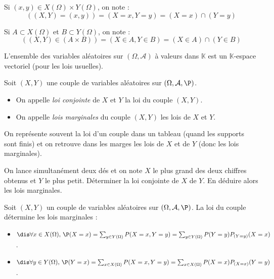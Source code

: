 \documentclass[a4paper,10pt]{report}
\begin{document}
\begin{preuve}

\vspace{5cm}
\end{preuve}

\begin{notas}
\item Si $(x,y) \in X(\Omega) \times Y(\Omega)$, on note :
$$ ((X,Y)=(x,y))= (X=x,Y=y) = (X=x) \cap (Y=y)$$
\item Si $A \subset X(\Omega)$ et $B \subset Y(\Omega)$, on note :
$$ ((X,Y) \in (A \times B)) = (X \in A, Y \in B)= (X \in A) \cap (Y \in B)$$
\end{notas}

\begin{cor}[Admis] L'ensemble des variables aléatoires sur $(\Omega, \mathcal{A})$ à valeurs dans $\mathbb{K}$ est un $\mathbb{K}$-espace vectoriel (pour les lois usuelles).
\end{cor}

%

\begin{defin} Soit $(X,Y)$ une couple de variables aléatoires sur $(\Omega, \mathcal{A}, \P)$. 
\begin{itemize}
\item On appelle \textit{loi conjointe} de $X$ et $Y$ la loi du couple $(X,Y)$.
\item On appelle \textit{lois marginales} du couple $(X,Y)$ les lois de $X$ et $Y$.
\end{itemize}
\end{defin}

\begin{rem} On représente souvent la loi d'un couple dans un tableau (quand les supports sont finis) et on retrouve dans les marges les lois de $X$ et de $Y$ (donc les lois marginales).
\end{rem}

\begin{ex} On lance simultanément deux dés et on note $X$ le plus grand des deux chiffres obtenus et $Y$ le plus petit. Déterminer la loi conjointe de $X$ de $Y$. En déduire alors les lois marginales.

\vspace{10cm}
\end{ex}

\begin{prop} Soit $(X,Y)$ un couple de variables aléatoires sur $(\Omega, \mathcal{A}, \P)$.  La loi du couple détermine les lois marginales :

\begin{itemize}
\item $\dis \forall x \in X(\Omega), \, \P(X=x) = \sum_{y \in Y(\Omega)} P(X=x, Y=y) = \sum_{y \in Y(\Omega)} P(Y=y)P_{(Y=y)}(X=x)$.
\item $\dis \forall y \in Y(\Omega), \, \P(Y=x) = \sum_{x \in X(\Omega)} P(X=x, Y=y) = \sum_{x \in X(\Omega)} P(X=x)P_{(X=x)}(Y=y)$.
\end{itemize}
\end{prop}
\end{document}
